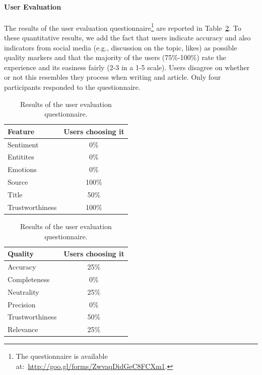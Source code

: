 \documentclass{llncs}
\begin{document}
\paragraph{User Evaluation}
The results of the user evaluation questionnaire\footnote{The questionnaire is available at:~\url{http://goo.gl/forms/ZwvaqDidGeC8FCXm1}.} are reported in Table~\ref{tab:questm}. To these quantitative results, we add the fact that users indicate accuracy and also indicators from social media (e.g., discussion on the topic, likes) as possible quality markers and that the majority of the users (75\%-100\%) rate the experience and its easiness fairly (2-3 in a 1-5 scale). Users disagree on whether or not this resembles they process when writing and article. Only four participants responded to the questionnaire.
\begin{table}
\centering
\caption{Results of the user evaluation questionnaire.\label{tab:questm}}
\begin{tabular}{| l | c |}
\hline
{\bf Feature} & {\bf Users choosing it} \\ \hline
Sentiment & 0\% \\ \hline
Entitites & 0\% \\ \hline
Emotions & 0\% \\ \hline
Source & 100\% \\ \hline
Title & 50\% \\ \hline
Trustworthiness & 100\% \\ \hline
\end{tabular}
\begin{tabular}{| l | c |}
\hline
{\bf Quality} & {\bf  Users choosing it} \\ \hline
Accuracy & 25\% \\ \hline
Completeness & 0\% \\ \hline
Neutrality & 25\% \\ \hline
Precision & 0\% \\ \hline
Trustworthiness & 50\% \\ \hline
Relevance & 25\% \\ \hline
\end{tabular}


\end{table}
\end{document}
